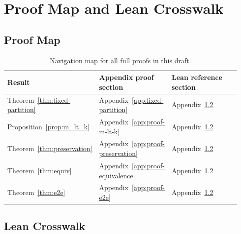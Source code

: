 \documentclass[11pt]{article}
\begin{document}
\appendix

\section{Proof Map and Lean Crosswalk}\label{app:proof-map}

\subsection{Proof Map}

\begin{table}[h]
\centering
\small
\begin{tabular}{p{0.34\linewidth}p{0.24\linewidth}p{0.36\linewidth}}
\toprule
Result & Appendix proof section & Lean reference section \\
\midrule
Theorem~\ref{thm:fixed-partition} & Appendix~\ref{app:fixed-partition} & Appendix~\ref{app:lean-crosswalk} \\
Proposition~\ref{prop:m_lt_k} & Appendix~\ref{app:proof-m-lt-k} & Appendix~\ref{app:lean-crosswalk} \\
Theorem~\ref{thm:preservation} & Appendix~\ref{app:proof-preservation} & Appendix~\ref{app:lean-crosswalk} \\
Theorem~\ref{thm:equiv} & Appendix~\ref{app:proof-equivalence} & Appendix~\ref{app:lean-crosswalk} \\
Theorem~\ref{thm:e2e} & Appendix~\ref{app:proof-e2e} & Appendix~\ref{app:lean-crosswalk} \\
\bottomrule
\end{tabular}
\caption{Navigation map for all full proofs in this draft.}
\end{table}

\subsection{Lean Crosswalk}\label{app:lean-crosswalk}
\end{document}
